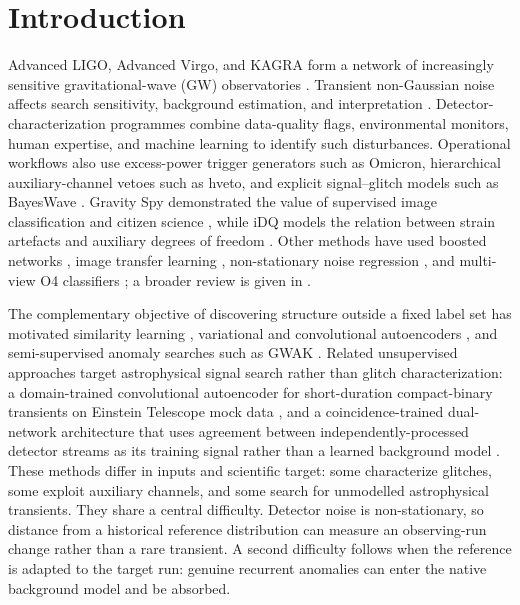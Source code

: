 \documentclass[12pt]{article}
\begin{document}
\section{Introduction}
\label{sec:introduction}

Advanced LIGO, Advanced Virgo, and KAGRA form a network of increasingly
sensitive gravitational-wave (GW) observatories
\cite{LIGOScientific:2014pky,Acernese_2014,KAGRA:2020tym}.  Transient
non-Gaussian noise affects search sensitivity, background estimation, and
interpretation \cite{nuttall2018,davis2021,soni2025,pankow2018}.
Detector-characterization programmes
combine data-quality flags, environmental monitors, human expertise, and
machine learning to identify such disturbances.  Operational workflows also
use excess-power trigger generators such as Omicron, hierarchical
auxiliary-channel vetoes such as hveto, and explicit signal--glitch models such
as BayesWave \cite{robinet2020,smith2011,cornish2015}.  Gravity Spy demonstrated the
value of supervised image classification and citizen science
\cite{biswas2013,powell2015,zevin2017,bahaadini2018,glanzer2023}, while iDQ models the relation between
strain artefacts and auxiliary degrees of freedom \cite{essick2020}.  Other
methods have used boosted networks \cite{mukund2017}, image transfer learning
\cite{razzano2018,george2018}, non-stationary noise regression
\cite{vajente2020,ormiston2020}, and multi-view O4 classifiers \cite{wu2024};
a broader review is given in \cite{cuoco2021}.

The complementary objective of discovering structure outside a fixed label set
has motivated similarity learning \cite{coughlin2019}, variational and
convolutional autoencoders \cite{sakai2022,laguarta2023}, and semi-supervised
anomaly searches such as GWAK \cite{raikman2023}.  Related unsupervised
approaches target astrophysical signal search rather than glitch
characterization: a domain-trained convolutional autoencoder for short-duration
compact-binary transients on Einstein Telescope mock data
\cite{et_anomaly2025}, and a coincidence-trained dual-network architecture that
uses agreement between independently-processed detector streams as its training
signal rather than a learned background model \cite{coad2026}.  These methods
differ in inputs and scientific target: some characterize glitches, some
exploit auxiliary channels, and some search for unmodelled astrophysical
transients.
They share a central difficulty.  Detector noise is non-stationary, so distance
from a historical reference distribution can measure an observing-run change
rather than a rare transient.  A second difficulty follows when the reference
is adapted to the target run: genuine recurrent anomalies can enter the native
background model and be absorbed.
\end{document}
